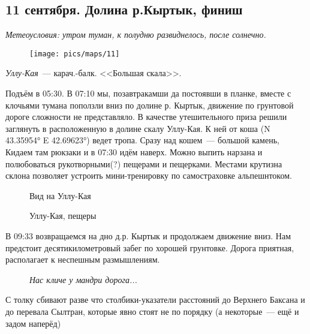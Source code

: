 \subsection{11 сентября. Долина р.Кыртык, финиш}
\textit{Метеоусловия: утром туман, к полудню развиднелось, после солнечно.}

\begin{figure}[h!]
	\centering
	\texttt{[image: pics/maps/11]}
	\label{fig:11}
\end{figure}

\textit{Уллу-Кая}~--- карач.-балк. <<Большая скала>>.

Подъём в 05:30. В 07:10 мы, позавтракамши да постоявши в планке, вместе с клочьями тумана поползли вниз по долине р. Кыртык, движение по грунтовой дороге сложности не представляло. В качестве утешительного приза решили заглянуть в расположенную в долине скалу Уллу-Кая. К ней от коша (N 43.35954° E 42.69623°) ведет тропа. Сразу над кошем~--- большой камень, Кидаем там рюкзаки и в 07:30 идём наверх. Можно выпить нарзана и полюбоваться рукотворными(?) пещерами и пещерками. Местами крутизна склона позволяет устроить мини-тренировку по самостраховке альпешнтоком.

\begin{figure}[h!]
	\centering
	\caption{Вид на Уллу-Кая}
	\label{fig:uulu-kaya}
\end{figure}

\begin{figure}[h!]
	\centering
	\caption{Уллу-Кая, пещеры}
	\label{fig:uulu-kaya1}
\end{figure}

В 09:33 возвращаемся на дно д.р. Кыртык и продолжаем движение вниз. Нам предстоит десятикилометровый забег по хорошей грунтовке. Дорога приятная, располагает к неспешным размышлениям. 

\begin{figure}[h!]
	\centering
	\caption{\textit{Нас кличе у мандри дорога...}}
	\label{fig:doroga}
\end{figure}


С толку сбивают разве что столбики-указатели расстояний до Верхнего Баксана и до перевала Сылтран, которые явно стоят не по порядку (а некоторые~--- ещё и задом наперёд)

